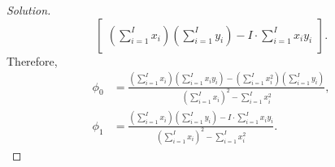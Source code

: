 \documentclass[10pt]{article}
\begin{document}
\begin{proof}[Solution]
\begin{equation*}
\begin{bmatrix}
            \left( \sum\limits_{i=1}^I{x_i} \right) \left( \sum\limits_{i=1}^I{y_i} \right) - I \cdot \sum\limits_{i=1}^I{x_i y_i}
        \end{bmatrix}. 
    \end{equation*}
    Therefore, 
    \begin{align*}
        \phi_0 &= \frac{\left( \sum\limits_{i=1}^I{x_i} \right) \left(\sum\limits_{i=1}^I{x_i y_i} \right) - \left( \sum\limits_{i=1}^I{x_i^2} \right) \left( \sum\limits_{i=1}^I{y_i} \right)}{\left( \sum\limits_{i=1}^I{x_i} \right)^2 - \sum\limits_{i=1}^I{x_i^2}}, \\
        \phi_1 &= \frac{\left( \sum\limits_{i=1}^I{x_i} \right) \left( \sum\limits_{i=1}^I{y_i} \right) - I \cdot \sum\limits_{i=1}^I{x_i y_i}}{\left( \sum\limits_{i=1}^I{x_i} \right)^2 - \sum\limits_{i=1}^I{x_i^2}}. 
    \end{align*}
\end{proof}
\end{document}
